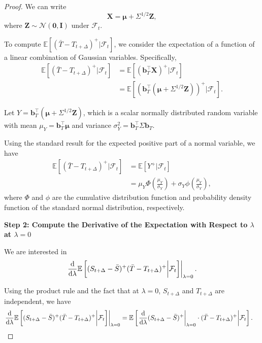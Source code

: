 \documentclass[10pt,a4paper,reqno]{amsart}
\theoremstyle{example}
\newcommand*\D{\mathop{}\!\textnormal{d}}
\begin{document}
\begin{proof}
We can write
\[
\mathbf{X} = \boldsymbol{\mu} + \Sigma^{1/2} \mathbf{Z},
\]
where $\mathbf{Z} \sim \mathcal{N}(\mathbf{0}, \mathbf{I})$ under $\mathcal{F}_t$.

To compute $\mathbb{E}\left[ (\bar{T} - T_{t+\Delta})^+ \bigg| \mathcal{F}_t \right]$, we consider the expectation of a function of a linear combination of Gaussian variables. Specifically,
\begin{align}
\mathbb{E}\left[ (\bar{T} - T_{t+\Delta})^+ \bigg| \mathcal{F}_t \right] &= \mathbb{E}\left[ \left( \mathbf{b}_T^\intercal \mathbf{X} \right)^+ \bigg| \mathcal{F}_t \right] \\
&= \mathbb{E}\left[ \left( \mathbf{b}_T^\intercal (\boldsymbol{\mu} + \Sigma^{1/2} \mathbf{Z}) \right)^+ \bigg| \mathcal{F}_t \right].
\end{align}

Let $Y = \mathbf{b}_T^\intercal (\boldsymbol{\mu} + \Sigma^{1/2} \mathbf{Z})$, which is a scalar normally distributed random variable with mean $\mu_Y = \mathbf{b}_T^\intercal \boldsymbol{\mu}$ and variance $\sigma_Y^2 = \mathbf{b}_T^\intercal \Sigma \mathbf{b}_T$.

Using the standard result for the expected positive part of a normal variable, we have
\begin{align}
\mathbb{E}\left[ (\bar{T} - T_{t+\Delta})^+ \bigg| \mathcal{F}_t \right] &= \mathbb{E}\left[ Y^+ \bigg| \mathcal{F}_t \right] \\
&= \mu_Y \Phi\left( \frac{\mu_Y}{\sigma_Y} \right) + \sigma_Y \phi\left( \frac{\mu_Y}{\sigma_Y} \right),
\end{align}
where $\Phi$ and $\phi$ are the cumulative distribution function and probability density function of the standard normal distribution, respectively.

\textbf{Step 2: Compute the Derivative of the Expectation with Respect to $\lambda$ at $\lambda = 0$}

We are interested in
\begin{align}
\left. \frac{\D}{\D \lambda} \mathbb{E}\left[ (S_{t+\Delta} - \bar{S})^+ (\bar{T} - T_{t+\Delta})^+ \bigg| \mathcal{F}_t \right] \right|_{\lambda = 0}.
\end{align}

Using the product rule and the fact that at $\lambda = 0$, $S_{t+\Delta}$ and $T_{t+\Delta}$ are independent, we have
\begin{align}
\left. \frac{\D}{\D \lambda} \mathbb{E}\left[ (S_{t+\Delta} - \bar{S})^+ (\bar{T} - T_{t+\Delta})^+ \bigg| \mathcal{F}_t \right] \right|_{\lambda = 0} &= \mathbb{E}\left[ \left. \frac{\D}{\D \lambda} (S_{t+\Delta} - \bar{S})^+ \right|_{\lambda = 0} \cdot (\bar{T} - T_{t+\Delta})^+ \bigg| \mathcal{F}_t \right].
\end{align}


\end{proof}
\end{document}
